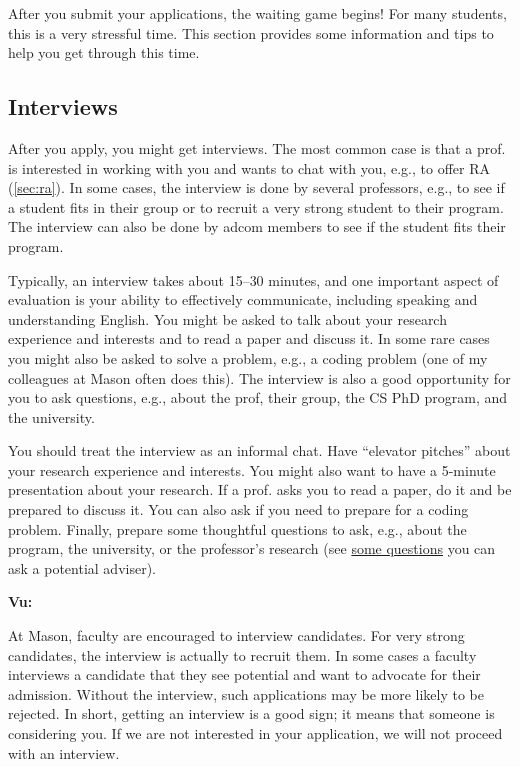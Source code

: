 \documentclass[oneside,11pt,dvipsnames]{book}
\newenvironment{commentbox}[1][]{
  \small
  \begin{mybox}
    {\small \textbf{#1}}
  }{
  \end{mybox}
}
\begin{document}
After you submit your applications, the waiting game begins! For many students, this is a very stressful time. This section provides some information and tips to help you get through this time.

\subsection{Interviews} 

After you apply, you might get interviews. The most common case is that a prof. is interested in working with you and wants to chat with you, e.g., to offer RA (\autoref{sec:ra}). In some cases, the interview is done by several professors, e.g., to see if a student fits in their group or to recruit a very strong student to their program. The interview can also be done by adcom members to see if the student fits their program.

Typically, an interview takes about 15--30 minutes, and one important aspect of evaluation is your ability to effectively communicate, including speaking and understanding English. 
You might be asked to talk about your research experience and interests and to read a paper and discuss it. In some rare cases you might also be asked to solve a problem, e.g., a coding problem (one of my colleagues at Mason often does this).
The interview is also a good opportunity for you to ask questions, e.g., about the prof, their group, the CS PhD program, and the university.

You should treat the interview as an informal chat. Have ``elevator pitches'' about your research experience and interests. You might also want to have a 5-minute presentation about your research. If a prof. asks you to read a paper, do it and be prepared to discuss it. You can also ask if you need to prepare for a coding problem. Finally, prepare some thoughtful questions to ask, e.g., about the program, the university, or the professor's research (see \href{https://github.com/dynaroars/dynaroars.github.io/wiki/Answers-to-Ph.D-Advisor-Guide}{some questions} you can ask a potential adviser).

\begin{commentbox}[Vu:]
  At Mason, faculty are encouraged to interview candidates. For very strong candidates, the interview is actually to recruit them.  In some cases a faculty interviews a candidate that they see potential and want to advocate for their admission. Without the interview, such applications may be more likely to be rejected.
  \tcblower
  In short, getting an interview is a good sign; it means that someone is considering you. If we are not interested in your application, we will not proceed with an interview.
\end{commentbox}
\end{document}
